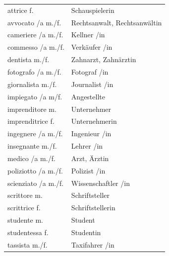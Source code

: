 \documentclass[10pt]{scrartcl}
\begin{document}
\begin{multicols*}{2}
\begin{supertabular}{p{4cm}p{4cm}}
attrice \hfill f. & Schauspielerin\\
avvocato /a \hfill m./f. & Rechtsanwalt, Rechtsanwältin\\
cameriere /a \hfill m./f. & Kellner /in\\
commesso /a \hfill m./f. & Verkäufer /in\\
dentista \hfill m./f. & Zahnarzt, Zahnärztin\\
fotografo /a \hfill m./f. & Fotograf /in\\
giornalista \hfill m./f. & Journalist /in\\
impiegato /a \hfill m/f. & Angestellte\\
imprenditore \hfill m. & Unternehmer\\
imprenditrice \hfill f. & Unternehmerin\\
ingegnere /a \hfill m./f. & Ingenieur /in\\
insegnante \hfill m./f. & Lehrer /in\\
medico /a \hfill m./f. & Arzt, Ärztin\\
poliziotto /a \hfill m./f. & Polizist /in\\
scienziato /a \hfill m./f. & Wissenschaftler /in\\
scrittore \hfill m. & Schriftsteller\\
scrittrice \hfill f. & Schriftstellerin\\
studente \hfill m. & Student\\
studentessa \hfill f. & Studentin\\
tassista \hfill m./f. & Taxifahrer /in\\
\end{supertabular} 

\end{multicols*}
\end{document}
